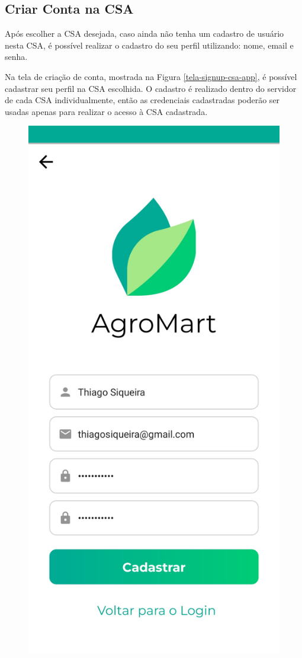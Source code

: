 \subsection{Criar Conta na CSA}
Após escolher a CSA desejada, caso ainda não tenha um cadastro de usuário nesta CSA, é possível realizar o cadastro do seu perfil utilizando: nome, email e senha.

Na tela de criação de conta, mostrada na Figura \ref{tela-signup-csa-app}, é possível cadastrar seu perfil na CSA escolhida. O cadastro é realizado dentro do servidor de cada CSA individualmente, então as credenciais cadastradas poderão ser usadas apenas para realizar o acesso à CSA cadastrada.

\begin{figure}[h]
	\centering
	\includegraphics[keepaspectratio=true,scale=0.16]{figuras/signup_app.jpg}

\end{figure}
